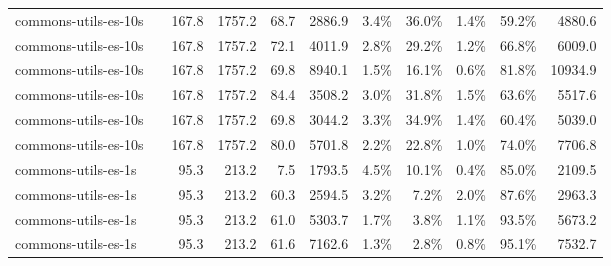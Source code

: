 \begin{tabular}{llrrrrrrrrr}
  {reporttablerow}\label{tabrow:tab-teralizer-stage-runtimes:commons-utils-es-10s@3ANAIVE_10_TRIES}commons-utils-es-10s & \VariantNaiveA{} & 167.8 & 1757.2 & 68.7 & 2886.9 & 3.4\% & 36.0\% & 1.4\% & 59.2\% & 4880.6 \\
  {reporttablerow}\label{tabrow:tab-teralizer-stage-runtimes:commons-utils-es-10s@3ANAIVE_50_TRIES}commons-utils-es-10s & \VariantNaiveB{} & 167.8 & 1757.2 & 72.1 & 4011.9 & 2.8\% & 29.2\% & 1.2\% & 66.8\% & 6009.0 \\
  {reporttablerow}\label{tabrow:tab-teralizer-stage-runtimes:commons-utils-es-10s@3ANAIVE_200_TRIES}commons-utils-es-10s & \VariantNaiveC{} & 167.8 & 1757.2 & 69.8 & 8940.1 & 1.5\% & 16.1\% & 0.6\% & 81.8\% & 10934.9 \\
  {reporttablerow}\label{tabrow:tab-teralizer-stage-runtimes:commons-utils-es-10s@3AIMPROVED_10_TRIES}commons-utils-es-10s & \VariantImprovedA{} & 167.8 & 1757.2 & 84.4 & 3508.2 & 3.0\% & 31.8\% & 1.5\% & 63.6\% & 5517.6 \\
  {reporttablerow}\label{tabrow:tab-teralizer-stage-runtimes:commons-utils-es-10s@3AIMPROVED_50_TRIES}commons-utils-es-10s & \VariantImprovedB{} & 167.8 & 1757.2 & 69.8 & 3044.2 & 3.3\% & 34.9\% & 1.4\% & 60.4\% & 5039.0 \\
  {reporttablerow}\label{tabrow:tab-teralizer-stage-runtimes:commons-utils-es-10s@3AIMPROVED_200_TRIES}commons-utils-es-10s & \VariantImprovedC{} & 167.8 & 1757.2 & 80.0 & 5701.8 & 2.2\% & 22.8\% & 1.0\% & 74.0\% & 7706.8 \\
  \midrule
  {reporttablerow}\label{tabrow:tab-teralizer-stage-runtimes:commons-utils-es-1s@3ABASELINE}commons-utils-es-1s & \VariantBaseline{} & 95.3 & 213.2 & 7.5 & 1793.5 & 4.5\% & 10.1\% & 0.4\% & 85.0\% & 2109.5 \\
  {reporttablerow}\label{tabrow:tab-teralizer-stage-runtimes:commons-utils-es-1s@3ANAIVE_10_TRIES}commons-utils-es-1s & \VariantNaiveA{} & 95.3 & 213.2 & 60.3 & 2594.5 & 3.2\% & 7.2\% & 2.0\% & 87.6\% & 2963.3 \\
  {reporttablerow}\label{tabrow:tab-teralizer-stage-runtimes:commons-utils-es-1s@3ANAIVE_50_TRIES}commons-utils-es-1s & \VariantNaiveB{} & 95.3 & 213.2 & 61.0 & 5303.7 & 1.7\% & 3.8\% & 1.1\% & 93.5\% & 5673.2 \\
  {reporttablerow}\label{tabrow:tab-teralizer-stage-runtimes:commons-utils-es-1s@3ANAIVE_200_TRIES}commons-utils-es-1s & \VariantNaiveC{} & 95.3 & 213.2 & 61.6 & 7162.6 & 1.3\% & 2.8\% & 0.8\% & 95.1\% & 7532.7 \\

\end{tabular}

